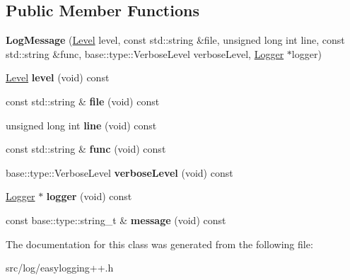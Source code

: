 \subsection*{Public Member Functions}
\begin{DoxyCompactItemize}
\item 
{\bfseries Log\+Message} (\hyperlink{namespaceel_ab0ac6091262344c52dd2d3ad099e8e36}{Level} level, const std\+::string \&file, unsigned long int line, const std\+::string \&func, base\+::type\+::\+Verbose\+Level verbose\+Level, \hyperlink{classel_1_1Logger}{Logger} $\ast$logger)\hypertarget{classel_1_1LogMessage_a6cb875167d28c57e11877f833d733e04}{}\label{classel_1_1LogMessage_a6cb875167d28c57e11877f833d733e04}

\item 
\hyperlink{namespaceel_ab0ac6091262344c52dd2d3ad099e8e36}{Level} {\bfseries level} (void) const \hypertarget{classel_1_1LogMessage_a09514a3bb7deae447c3141bc55b52d06}{}\label{classel_1_1LogMessage_a09514a3bb7deae447c3141bc55b52d06}

\item 
const std\+::string \& {\bfseries file} (void) const \hypertarget{classel_1_1LogMessage_a8f72164d7bf31ea3b15a5c0201fca0c4}{}\label{classel_1_1LogMessage_a8f72164d7bf31ea3b15a5c0201fca0c4}

\item 
unsigned long int {\bfseries line} (void) const \hypertarget{classel_1_1LogMessage_a4bc97e6670d890cae719e3e9680b8373}{}\label{classel_1_1LogMessage_a4bc97e6670d890cae719e3e9680b8373}

\item 
const std\+::string \& {\bfseries func} (void) const \hypertarget{classel_1_1LogMessage_ae09cdff5620dcf8269b2b83bea722a2a}{}\label{classel_1_1LogMessage_ae09cdff5620dcf8269b2b83bea722a2a}

\item 
base\+::type\+::\+Verbose\+Level {\bfseries verbose\+Level} (void) const \hypertarget{classel_1_1LogMessage_a52e91b0dd3e5af96642622cc2a67aa88}{}\label{classel_1_1LogMessage_a52e91b0dd3e5af96642622cc2a67aa88}

\item 
\hyperlink{classel_1_1Logger}{Logger} $\ast$ {\bfseries logger} (void) const \hypertarget{classel_1_1LogMessage_ae67b30a16a4115148ee32c9b2c91e03c}{}\label{classel_1_1LogMessage_ae67b30a16a4115148ee32c9b2c91e03c}

\item 
const base\+::type\+::string\+\_\+t \& {\bfseries message} (void) const \hypertarget{classel_1_1LogMessage_a0f34882ed8102061bb9bb247cb08a5c3}{}\label{classel_1_1LogMessage_a0f34882ed8102061bb9bb247cb08a5c3}

\end{DoxyCompactItemize}


The documentation for this class was generated from the following file\+:\begin{DoxyCompactItemize}
\item 
src/log/easylogging++.\+h\end{DoxyCompactItemize}
